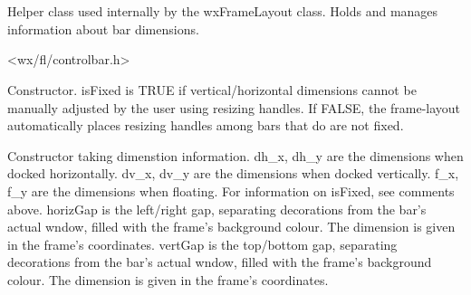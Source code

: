 %
%


\section{}\label{cbdiminfo}


Helper class used internally by the wxFrameLayout class.
Holds and manages information about bar dimensions.




<wx/fl/controlbar.h>




\label{cbdiminfocbdiminfo}


Constructor.
isFixed is TRUE if vertical/horizontal dimensions cannot be manually adjusted
by the user using resizing handles. If FALSE, the frame-layout
automatically places resizing handles among bars that do are not fixed.



Constructor taking dimenstion information.
dh\_x, dh\_y are the dimensions when docked horizontally.
dv\_x, dv\_y are the dimensions when docked vertically.
f\_x, f\_y are the dimensions when floating.
For information on isFixed, see comments above.
horizGap is the left/right gap, separating decorations
from the bar's actual wndow, filled with the frame's background colour.
The dimension is given in the frame's coordinates.
vertGap is the top/bottom gap, separating decorations
from the bar's actual wndow, filled with the frame's background colour.
The dimension is given in the frame's coordinates.



